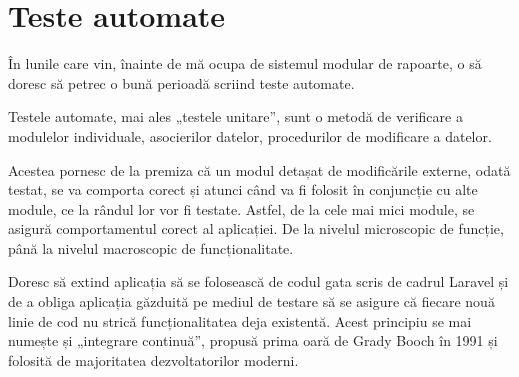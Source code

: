 \section{Teste automate}
	În lunile care vin, înainte de mă ocupa de sistemul modular de rapoarte, o să doresc să petrec o bună perioadă scriind teste automate.

	Testele automate, mai ales „testele unitare”, sunt o metodă de verificare a modulelor individuale, asocierilor datelor, procedurilor de modificare a datelor. \cite{testare_automata}

	Acestea pornesc de la premiza că un modul detașat de modificările externe, odată testat, se va comporta corect și atunci când va fi folosit în conjuncție cu alte module, ce la rândul lor vor fi testate. Astfel, de la cele mai mici module, se asigură comportamentul corect al aplicației. De la nivelul microscopic de funcție, până la nivelul macroscopic de funcționalitate.

	Doresc să extind aplicația să se folosească de codul gata scris de cadrul Laravel și de a obliga aplicația găzduită pe mediul de testare să se asigure că fiecare nouă linie de cod nu strică funcționalitatea deja existentă. Acest principiu se mai numește și „integrare continuă”, propusă prima oară de  Grady Booch în 1991 \cite{integrare_continua} și folosită de majoritatea dezvoltatorilor moderni.
